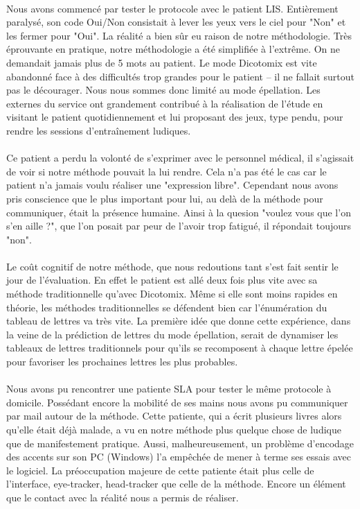 \documentclass[11pt,a4paper]{article}
\theoremstyle{plain}
\theoremstyle{definition}
\begin{document}
\paragraph{} Nous avons commencé par tester le protocole avec le patient LIS. Entièrement paralysé, son code Oui/Non consistait à lever les yeux vers le ciel pour "Non" et les fermer pour "Oui". La réalité a bien sûr eu raison de notre méthodologie. Très éprouvante en pratique, notre méthodologie a été simplifiée à l'extrême. On ne demandait jamais plus de 5 mots 
au patient. Le mode Dicotomix est vite abandonné face à des difficultés trop grandes pour le patient -- il ne fallait surtout pas le décourager. Nous nous sommes donc limité
au mode épellation. Les externes du service ont grandement contribué à la réalisation de l'étude en visitant le patient quotidiennement et lui proposant des jeux, type pendu, 
pour rendre les sessions d'entraînement ludiques. 

\paragraph{} Ce patient a perdu la volonté de s'exprimer avec le personnel médical, il s'agissait de voir si notre méthode pouvait la  lui rendre. Cela n'a pas été le cas car le patient n'a jamais voulu réaliser une "expression libre". Cependant nous avons pris conscience que le plus important pour lui, au delà de la 
 méthode pour communiquer, était la présence humaine. Ainsi à la quesion "voulez vous que l'on s'en aille ?", que l'on posait par peur de l'avoir trop fatigué, il répondait toujours "non".
 \paragraph{} Le coût cognitif de notre méthode, que nous redoutions tant s'est fait sentir le jour de l'évaluation. En effet le patient est allé deux fois plus vite avec sa 
 méthode traditionnelle qu'avec Dicotomix. Même si elle sont moins rapides en théorie, les méthodes traditionnelles se défendent bien car l'énumération du tableau de lettres
 va très vite. La première idée que donne cette expérience, dans la veine de la prédiction de lettres du mode épellation, serait de dynamiser les tableaux de lettres traditionnels
 pour qu'ils se recomposent à chaque lettre épelée pour favoriser les prochaines lettres les plus probables. 

\paragraph{}Nous avons pu rencontrer une patiente SLA pour tester le même protocole à domicile. Possédant encore la mobilité de ses mains nous avons pu communiquer par mail autour de la méthode.
Cette patiente, qui a écrit plusieurs livres alors qu'elle était déjà malade, a vu en notre méthode plus quelque chose de ludique que de manifestement pratique. Aussi, malheureusement, un problème 
d'encodage des accents sur son PC (Windows) l'a empêchée de mener à terme ses essais avec le logiciel. La préoccupation majeure de cette patiente était plus celle de l'interface, eye-tracker, head-tracker que
celle de la méthode. Encore un élément que le contact avec la réalité nous a permis de réaliser.
\end{document}
